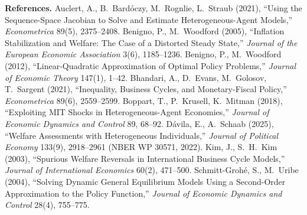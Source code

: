 \documentclass[11pt]{article}
\begin{document}
\vspace{0.4cm}\small
\noindent\textbf{References.}
Auclert, A., B.~Bardóczy, M.~Rognlie, L.~Straub (2021), ``Using the Sequence-Space Jacobian to Solve and Estimate Heterogeneous-Agent Models,'' \emph{Econometrica} 89(5), 2375--2408.
Benigno, P., M.~Woodford (2005), ``Inflation Stabilization and Welfare: The Case of a Distorted Steady State,'' \emph{Journal of the European Economic Association} 3(6), 1185--1236.
Benigno, P., M.~Woodford (2012), ``Linear-Quadratic Approximation of Optimal Policy Problems,'' \emph{Journal of Economic Theory} 147(1), 1--42.
Bhandari, A., D.~Evans, M.~Golosov, T.~Sargent (2021), ``Inequality, Business Cycles, and Monetary-Fiscal Policy,'' \emph{Econometrica} 89(6), 2559--2599.
Boppart, T., P.~Krusell, K.~Mitman (2018), ``Exploiting MIT Shocks in Heterogeneous-Agent Economies,'' \emph{Journal of Economic Dynamics and Control} 89, 68--92.
Dávila, E., A.~Schaab (2025), ``Welfare Assessments with Heterogeneous Individuals,'' \emph{Journal of Political Economy} 133(9), 2918--2961 (NBER WP 30571, 2022).
Kim, J., S.~H.~Kim (2003), ``Spurious Welfare Reversals in International Business Cycle Models,'' \emph{Journal of International Economics} 60(2), 471--500.
Schmitt-Grohé, S., M.~Uribe (2004), ``Solving Dynamic General Equilibrium Models Using a Second-Order Approximation to the Policy Function,'' \emph{Journal of Economic Dynamics and Control} 28(4), 755--775.
\end{document}
